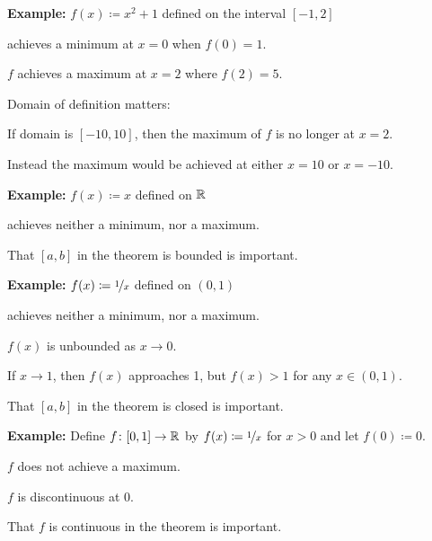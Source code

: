 \documentclass[10pt,aspectratio=149]{beamer}
\begin{document}
\begin{frame}

\textbf{Example:}
$f(x) \coloneqq x^2+1$ defined on the interval $[-1,2]$

achieves a minimum at $x=0$ when $f(0) = 1$.

\pause
$f$ achieves a maximum at $x=2$ where $f(2) = 5$.

\pause
\medskip

Domain of definition matters:

If domain is
$[-10,10]$, then the maximum of $f$ is no longer at $x=2$.

\pause
Instead the maximum would be achieved at either $x=10$ or $x=-10$.

\pause
\medskip

\textbf{Example:}
$f(x) \coloneqq x$ defined on ${\mathbb{R}}$

achieves neither a minimum, nor a maximum.

\pause
\medskip

That $[a,b]$ in the theorem is bounded is important.
\end{frame}

\begin{frame}

\textbf{Example:}
$f(x) \coloneqq \nicefrac{1}{x}$ defined on $(0,1)$

achieves neither a minimum, nor a maximum.

\pause
$f(x)$ is unbounded as $x \to 0$.

\pause
If $x \to 1$, then $f(x)$ approaches 1, but $f(x) > 1$ for any $x \in
(0,1)$.

\pause
\medskip

That $[a,b]$ in the theorem is closed is important.

\pause
\medskip

\textbf{Example:}
Define $f \colon [0,1] \to {\mathbb{R}}$ by 
$f(x) \coloneqq \nicefrac{1}{x}$ for $x > 0$ and let $f(0) \coloneqq 0$.

\pause
$f$ does not achieve a maximum.

\pause
$f$ is discontinuous at $0$.

\pause
\medskip

That $f$ is continuous in the theorem is important.
\end{frame}
\end{document}
